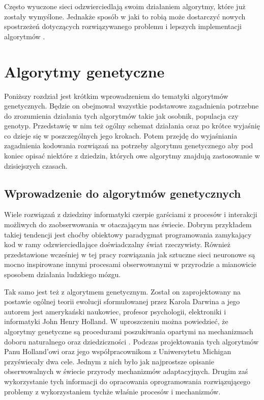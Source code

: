 \documentclass[12pt, oneside, a4paper]{report}
\begin{document}
Często wyuczone sieci odzwierciedlają swoim działaniem algorytmy, które już zostały wymyślone. Jednakże sposób w jaki to robią może dostarczyć nowych spostrzeżeń dotyczących rozwiązywanego problemu i lepszych implementacji algorytmów \citep{murray1995applications}.



\chapter{Algorytmy genetyczne}

Poniższy rozdział jest krótkim wprowadzeniem do tematyki algorytmów genetycznych. Będzie on obejmował wszystkie podstawowe zagadnienia potrzebne do zrozumienia działania tych algorytmów takie jak osobnik, populacja czy genotyp. Przedstawię w nim też ogólny schemat działania oraz po krótce wyjaśnię co dzieje się w poszczególnych jego krokach. Potem przejdę do wyjaśniania zagadnienia kodowania rozwiązań na potrzeby algorytmu genetycznego aby pod koniec opisać niektóre z dziedzin, których owe algorytmy znajdują zastosowanie w dzisiejszych czasach.

\section{Wprowadzenie do algorytmów genetycznych}

Wiele rozwiązań z dziedziny informatyki czerpie garściami z procesów i interakcji możliwych do zaobserwowania w otaczającym nas świecie. Dobrym przykładem takiej tendencji jest choćby obiektowy paradygmat programowania zamykający kod w ramy odzwierciedlające doświadczalny świat rzeczywisty. Również przedstawione wcześniej w tej pracy rozwiązania jak sztuczne sieci neuronowe są mocno inspirowane innymi procesami obserwowanymi w przyrodzie a mianowicie sposobem działania ludzkiego mózgu. 

Tak samo jest też z algorytmem genetycznym. Został on zaprojektowany na postawie ogólnej teorii ewolucji sformułowanej przez Karola Darwina a jego autorem jest amerykański naukowiec, profesor psychologii, elektroniki i informatyki John Henry Holland. W uproszczeniu można powiedzieć, że algorytmy genetyczne są procedurami poszukiwania opartymi na mechanizmach doboru naturalnego oraz dziedziczności \citep{goldberg1995algorytmygenetyczne}. Podczas projektowania tych algorytmów Panu Holland'owi oraz jego współpracownikom z Uniwersytetu Michigan przyświecały dwa cele. Jednym z nich było jak najprostsze opisanie obserwowalnych w świecie przyrody mechanizmów adaptacyjnych. Drugim zaś wykorzystanie tych informacji do opracowania oprogramowania rozwiązującego problemy z wykorzystaniem tychże właśnie procesów i mechanizmów.
\end{document}
